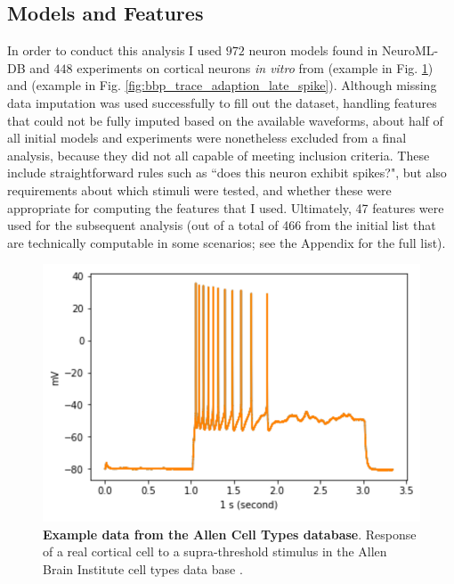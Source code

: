 


\subsection{Models and Features} 
In order to conduct this analysis I used $972$ neuron models found in NeuroML-DB \citep{birgiolas2016rapid} and $448$ experiments on cortical neurons \emph{in vitro} from \cite{gouwens2018systematic} (example in Fig. \ref{fig:adaptionm}) and \cite{markram2006blue} (example in Fig. \ref{fig:bbp_trace_adaption_late_spike}).
Although missing data imputation was used successfully to fill out the dataset, handling features that could not be fully imputed based on the available waveforms, about half of all initial models and experiments were nonetheless excluded from a final analysis, because they did not all capable of meeting inclusion criteria.
These include straightforward rules such as ``does this neuron exhibit spikes?", but also requirements about which stimuli were tested, and whether these were appropriate for computing the features that I used. 
Ultimately, 47 features were used for the subsequent analysis (out of a total of 466 from the initial list that are technically computable in some scenarios; see the Appendix for the full list).

\begin{figure}
    \begin{center}
    \includegraphics[width=0.6\linewidth]{figures/multi_spiking_large_allen}
    \caption[Example from Cell Types Database]{\textbf{Example data from the Allen Cell Types database}.
    Response of a real cortical cell to a supra-threshold stimulus in the Allen Brain Institute cell types data base \citep{gouwens2018systematic}.}
    \label{fig:adaptionm}
    \end{center}
\end{figure}    

